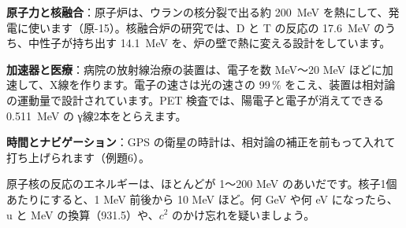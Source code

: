 \begin{phkougaku}[質量とエネルギーを数える技術]
\textbf{原子力と核融合}：原子炉は、ウランの核分裂で出る約 \qty{200}{MeV} を熱にして、発電に使います（原-15）。核融合炉の研究では、D と T の反応の \qty{17.6}{MeV} のうち、中性子が持ち出す \qty{14.1}{MeV} を、炉の壁で熱に変える設計をしています。

\textbf{加速器と医療}：病院の放射線治療の装置は、電子を数 MeV〜20 MeV ほどに加速して、X線を作ります。電子の速さは光の速さの 99\,\% をこえ、装置は相対論の運動量で設計されています。PET 検査では、陽電子と電子が消えてできる \qty{0.511}{MeV} の γ線2本をとらえます。

\textbf{時間とナビゲーション}：GPS の衛星の時計は、相対論の補正を前もって入れて打ち上げられます（例題6）。

\begin{phketa}[原子核と相対論の数の目安]
原子核の反応のエネルギーは、ほとんどが 1〜200 MeV のあいだです。核子1個あたりにすると、1 MeV 前後から 10 MeV ほど。何 GeV や何 eV になったら、u と MeV の換算（931.5）や、$c^2$ のかけ忘れを疑いましょう。
\end{phketa}
\end{phkougaku}

